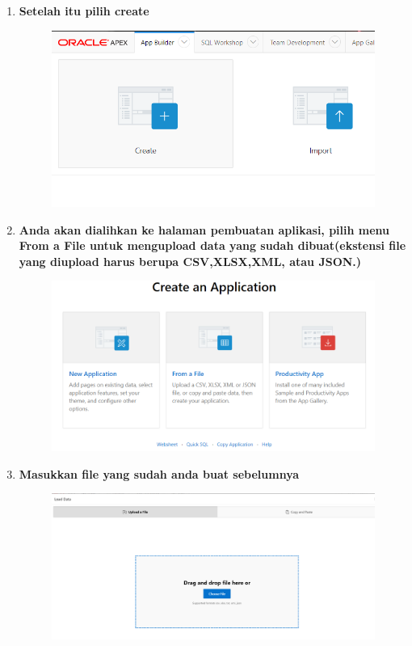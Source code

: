 \begin{enumerate}
\item \textbf{Setelah itu pilih create}\begin{figure}[H]
    \centering
    \includegraphics[scale=0.3]{figures/10.png}
    \label{10}
\end{figure}


\item \textbf{Anda akan dialihkan ke halaman pembuatan aplikasi, pilih menu From a File untuk mengupload data yang sudah dibuat(ekstensi file yang diupload harus berupa CSV,XLSX,XML, atau JSON.)}
\begin{figure}[H]
    \centering
    \includegraphics[scale=0.3]{figures/11.png}
    \label{11}
\end{figure}


\item \textbf{Masukkan file yang sudah anda buat sebelumnya}
\begin{figure}[H]
    \centering
    \includegraphics[scale=0.3]{figures/14.png}
    \label{12}
\end{figure}



\end{enumerate}
